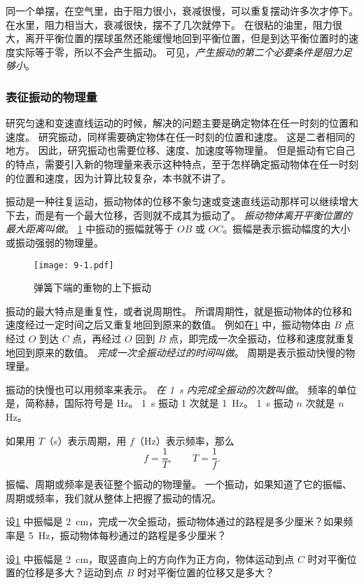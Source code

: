 同一个单摆，在空气里，由于阻力很小，衰减很慢，可以重复摆动许多次才停下。
在水里，阻力相当大，衰减很快，摆不了几次就停下。
在很粘的油里，阻力很大，离开平衡位置的摆球虽然还能缓慢地回到平衡位置，但是到达平衡位置时的速度实际等于零，所以不会产生振动。
可见，\emph{产生振动的第二个必要条件是阻力足够小}。

\subsubsection{表征振动的物理量}
研究匀速和变速直线运动的时候，解决的问题主要是确定物体在任一时刻的位置和速度。
研究振动，同样需要确定物体在任一时刻的位置和速度。
这是二者相同的地方。
因此，研究振动也需要位移、速度、加速度等物理量。
但是振动有它自己的特点，需要引入新的物理量来表示这种特点，至于怎样确定振动物体在任一时刻的位置和速度，因为计算比较复杂，本书就不讲了。

振动是一种往复运动，振动物体的位移不象匀速或变速直线运动那样可以继续增大下去，而是有一个最大位移，否则就不成其为振动了。
\emph{振动物体离开平衡位置的最大距离叫做}。
\cref{fig:9-1} 中振动的振幅就等于 $OB$ 或 $OC$。振幅是表示振动幅度的大小或振动强弱的物理量。

\begin{figure}
  \texttt{[image: 9-1.pdf]}
  \caption{弹簧下端的重物的上下振动}\label{fig:9-1}
\end{figure}

振动的最大特点是重复性，或者说周期性。
所谓周期性，就是振动物体的位移和速度经过一定时间之后又重复地回到原来的数值。
例如在\cref{fig:9-1} 中，振动物体由 $B$ 点经过 $O$ 到达 $C$ 点，再经过 $O$ 回到 $B$ 点，即完成一次全振动，位移和速度就重复地回到原来的数值。
\emph{完成一次全振动经过的时间叫做}。
周期是表示振动快慢的物理量。

振动的快慢也可以用频率来表示。
\emph{在 \qty{1}{s} 内完成全振动的次数叫做}。
频率的单位是，简称赫，国际符号是 \unit{Hz}。
\qty{1}{s} 振动 1 次就是 \qty{1}{Hz}。
\qty{1}{s} 振动 $n$ 次就是 $n$ \unit{Hz}。

如果用 $T$（\unit{s}）表示周期，用 $f$（\unit{Hz}）表示频率，那么
\[f=\frac{1}{T},\qquad T=\frac{1}{f}.\]

振幅、周期或频率是表征整个振动的物理量。
一个振动，如果知道了它的振幅、周期或频率，我们就从整体上把握了振动的情况。

\begin{Practice}
\begin{question}
  \item 设\cref{fig:9-1} 中振幅是 \qty{2}{cm}，完成一次全振动，振动物体通过的路程是多少厘米？如果频率是 \qty{5}{Hz}，振动物体每秒通过的路程是多少厘米？
  \item 设\cref{fig:9-1} 中振幅是 \qty{2}{cm}，取竖直向上的方向作为正方向，物体运动到点 $C$ 时对平衡位置的位移是多大？运动到点 $B$ 时对平衡位置的位移又是多大？
\end{question}
\end{Practice}

